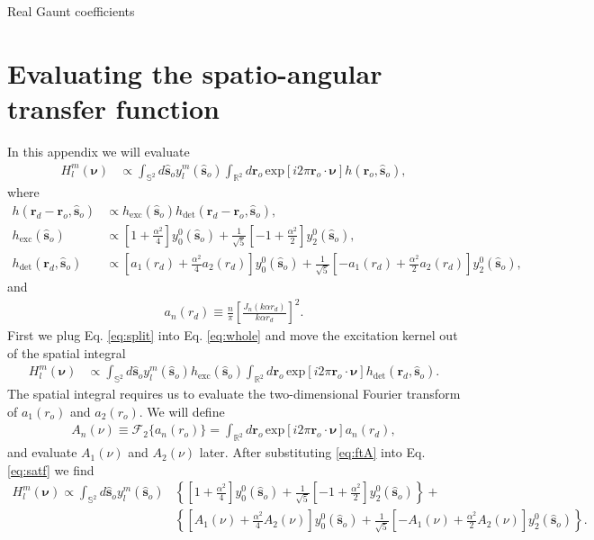 \documentclass{osa-article}
\providecommand{\ro}{\mathbf{\mathbf{r}}_o}
\providecommand{\so}{\mathbf{\hat{s}}_o}
\providecommand{\rd}{\mathbf{r}_d}
\providecommand{\mbb}[1]{\mathbb{#1}}
\providecommand{\bs}[1]{\boldsymbol{#1}}
\begin{document}
Real Gaunt coefficients

\section{Evaluating the spatio-angular transfer function}
In this appendix we will evaluate 
\begin{align}
    H_l^m(\bs{\nu}) &\propto \int_{\mbb{S}^2}d\so{}y_l^m(\so{})\int_{\mbb{R}^2}d\ro{}\,\text{exp}\left[i2\pi \ro{}\cdot\bs{\nu}\right]h(\ro{}, \so{}),\label{eq:whole}
\end{align}
where
\begin{align}
  h(\rd{} - \ro{}, \so{}) &\propto h_{\text{exc}}(\so{})h_{\text{det}}(\rd{} - \ro{}, \so{}),\label{eq:split}\\ 
  h_{\text{exc}}(\so{}) &\propto \left[1 + \frac{\alpha^2}{4}\right]y_0^0(\so{}) + \frac{1}{\sqrt{5}}\left[-1 + \frac{\alpha^2}{2}\right]y_2^0(\so{}),\\  
  h_{\text{det}}(\rd{}, \so{}) &\propto \left[a_1( r_d) + \frac{\alpha^2}{4} a_2( r_d)\right]y_0^0(\so{}) + \frac{1}{\sqrt{5}}\left[- a_1( r_d) + \frac{\alpha^2}{2} a_2( r_d)\right]y_2^0(\so{}),
\end{align}
and
\begin{align}
    a_n(r_d) \equiv \frac{n}{\pi}\left[\frac{J_n(k\alpha r_d)}{k\alpha r_d}\right]^2. 
\end{align}
First we plug Eq. \ref{eq:split} into Eq. \ref{eq:whole} and move the excitation
kernel out of the spatial integral
\begin{align}
    H_l^m(\bs{\nu}) &\propto \int_{\mbb{S}^2}d\so{}y_l^m(\so{})h_{\text{exc}}(\so{})\int_{\mbb{R}^2}d\ro{}\,\text{exp}\left[i2\pi \ro{}\cdot\bs{\nu}\right]h_{\text{det}}(\rd{}, \so{}). \label{eq:satf}
\end{align}
The spatial integral requires us to evaluate the two-dimensional Fourier
transform of $a_1(r_o)$ and $a_2(r_o)$. We will define
\begin{align}
  A_n(\nu) \equiv \mathcal{F}_2\{a_n(r_o)\} =  \int_{\mbb{R}^2}d\ro{}\,\text{exp}\left[i2\pi \ro{}\cdot\bs{\nu}\right] a_n(r_d), \label{eq:ftA}
\end{align}
and evaluate $A_1(\nu)$ and $A_2(\nu)$ later. After substituting \ref{eq:ftA}
into Eq. \ref{eq:satf} we find 
\begin{align}
  H_l^m(\bs{\nu}) \propto \int_{\mbb{S}^2}d\so{}y_l^m(\so{})&\left\{\left[1 + \frac{\alpha^2}{4}\right]y_0^0(\so{}) + \frac{1}{\sqrt{5}}\left[-1 + \frac{\alpha^2}{2}\right]y_2^0(\so{})\right\} + \nonumber\\&\left\{\left[A_1(\nu) + \frac{\alpha^2}{4} A_2(\nu)\right]y_0^0(\so{}) + \frac{1}{\sqrt{5}}\left[- A_1(\nu) + \frac{\alpha^2}{2} A_2(\nu)\right]y_2^0(\so{})\right\}. 
\end{align}
\end{document}
